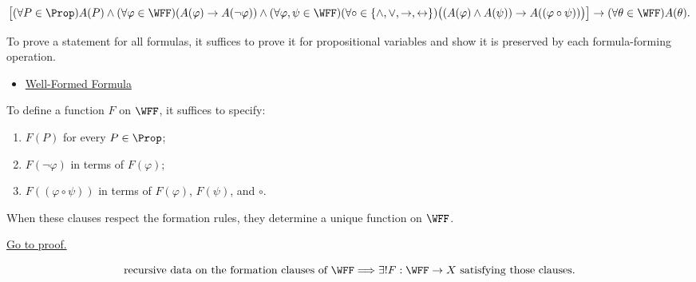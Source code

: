 \begin{remark*}
\[
\left[
(\forall P\in\Prop)A(P)
\land
(\forall\varphi\in\WFF)(A(\varphi)\to A(\neg\varphi))
\land
(\forall\varphi,\psi\in\WFF)
(\forall\circ\in\{\land,\lor,\to,\leftrightarrow\})
\bigl((A(\varphi)\land A(\psi))\to A((\varphi\circ\psi))\bigr)
\right]
\to
(\forall\theta\in\WFF)A(\theta).
\]
\end{remark*}

\begin{remark*}[Interpretation]
To prove a statement for all formulas, it suffices to prove it for propositional variables and show it is preserved by each formula-forming operation.
\end{remark*}

\begin{dependencies}
\begin{itemize}
  \item \hyperref[def:well-formed-formula]{Well-Formed Formula}
\end{itemize}
\end{dependencies}
\begin{tcolorbox}[colback=thmbox, colframe=thmborder, arc=2pt,
  left=6pt, right=6pt, top=4pt, bottom=4pt,
  title={\small\textbf{Theorem (Structural Recursion for Propositional Formulas)}},
  fonttitle=\small\bfseries]
\begin{theorem}
\label{thm:structural-recursion-propositional-formulas}
To define a function \(F\) on \(\WFF\), it suffices to specify:
\begin{enumerate}
\item \(F(P)\) for every \(P\in\Prop\);
\item \(F(\neg\varphi)\) in terms of \(F(\varphi)\);
\item \(F((\varphi\circ\psi))\) in terms of \(F(\varphi)\), \(F(\psi)\), and \(\circ\).
\end{enumerate}
When these clauses respect the formation rules, they determine a unique function on \(\WFF\).

\noindent\hyperref[prf:structural-recursion-propositional-formulas]{Go to proof.}
\end{theorem}
\end{tcolorbox}

\begin{remark*}
\[
\text{recursive data on the formation clauses of }\WFF
\Longrightarrow
\exists!F:\WFF\to X
\text{ satisfying those clauses}.
\]
\end{remark*}

